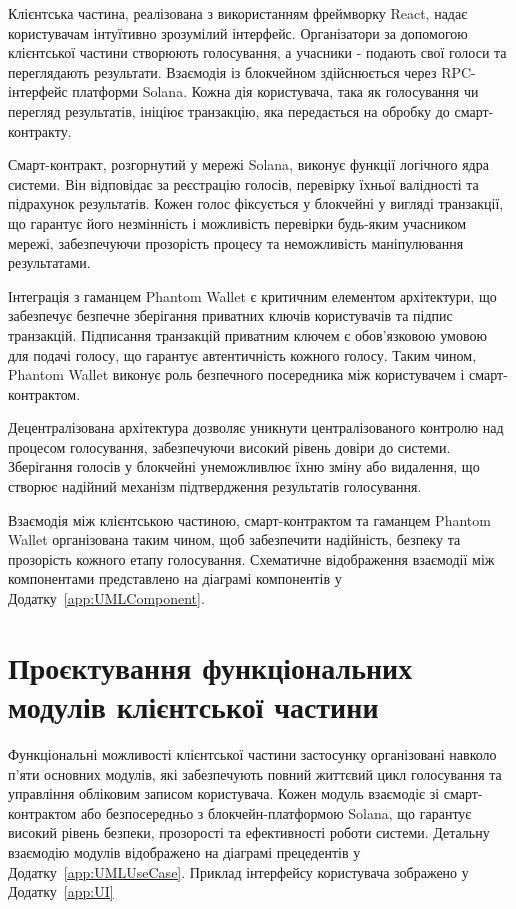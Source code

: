 \documentclass[14pt]{extreport}
\begin{document}
  Клієнтська частина, реалізована з використанням фреймворку React, надає користувачам інтуїтивно зрозумілий інтерфейс. Організатори за допомогою клієнтської частини створюють голосування, а учасники - подають свої голоси та переглядають результати. Взаємодія із блокчейном здійснюється через RPC-інтерфейс платформи Solana. Кожна дія користувача, така як голосування чи перегляд результатів, ініціює транзакцію, яка передається на обробку до смарт-контракту.

  Смарт-контракт, розгорнутий у мережі Solana, виконує функції логічного ядра системи. Він відповідає за реєстрацію голосів, перевірку їхньої валідності та підрахунок результатів. Кожен голос фіксується у блокчейні у вигляді транзакції, що гарантує його незмінність і можливість перевірки будь-яким учасником мережі, забезпечуючи прозорість процесу та неможливість маніпулювання результатами.

  Інтеграція з гаманцем Phantom Wallet є критичним елементом архітектури, що забезпечує безпечне зберігання приватних ключів користувачів та підпис транзакцій. Підписання транзакцій приватним ключем є обов'язковою умовою для подачі голосу, що гарантує автентичність кожного голосу. Таким чином, Phantom Wallet виконує роль безпечного посередника між користувачем і смарт-контрактом.

  Децентралізована архітектура дозволяє уникнути централізованого контролю над процесом голосування, забезпечуючи високий рівень довіри до системи. Зберігання голосів у блокчейні унеможливлює їхню зміну або видалення, що створює надійний механізм підтвердження результатів голосування.

  Взаємодія між клієнтською частиною, смарт-контрактом та гаманцем Phantom Wallet організована таким чином, щоб забезпечити надійність, безпеку та прозорість кожного етапу голосування. Схематичне відображення взаємодії між компонентами представлено на діаграмі компонентів у Додатку~\ref{app:UMLComponent}.
  
  \section{Проєктування функціональних модулів клієнтської частини}
  
  Функціональні можливості клієнтської частини застосунку організовані навколо п'яти основних модулів, які забезпечують повний життєвий цикл голосування та управління обліковим записом користувача. Кожен модуль взаємодіє зі смарт-контрактом або безпосередньо з блокчейн-платформою Solana, що гарантує високий рівень безпеки, прозорості та ефективності роботи системи. Детальну взаємодію модулів відображено на діаграмі прецедентів у Додатку~\ref{app:UMLUseCase}. Приклад інтерфейсу користувача зображено у Додатку~\ref{app:UI}
\end{document}

